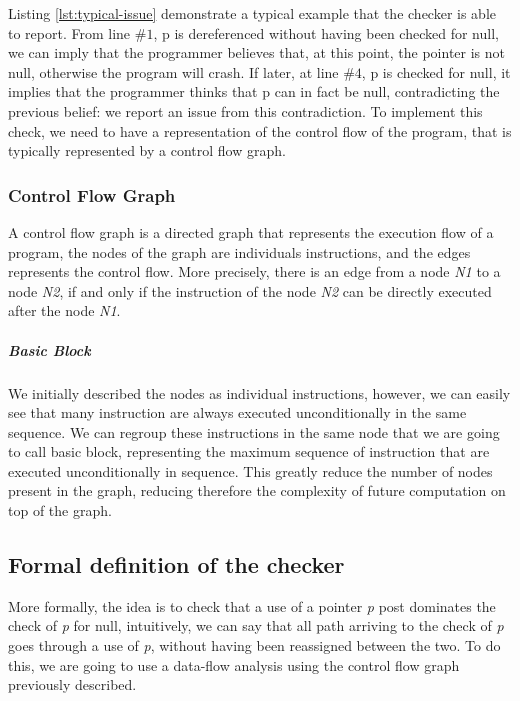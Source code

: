 

Listing \ref{lst:typical-issue} demonstrate a typical example that the checker is able to report. 
From line $\#1$, p is dereferenced without having been checked for null, we can imply that the programmer believes that, at this point, the pointer is not null, otherwise the program will crash. 
If later, at line $\#4$, p is checked for null, it implies that the programmer thinks that p can in fact be null, contradicting the previous belief: we report an issue from this contradiction.
To implement this check, we need to have a representation of the control flow of the program, that is typically represented by a control flow graph.

\subsubsection{Control Flow Graph}
\label{subsubsec:control_flow_graph}

A control flow graph is a directed graph that represents the execution flow of a program, the nodes of the graph are individuals instructions, and the edges represents the control flow. More precisely, there is an edge from a node \emph{N1} to a node \emph{N2}, if and only if the instruction of the node \emph{N2} can be directly executed after the node \emph{N1}.


\subparagraph{Basic Block}
We initially described the nodes as individual instructions, however, we can easily see that many instruction are always executed unconditionally in the same sequence.
We can regroup these instructions in the same node that we are going to call basic block, representing the maximum sequence of instruction that are executed unconditionally in sequence. 
This greatly reduce the number of nodes present in the graph, reducing therefore the complexity of future computation on top of the graph.

\subsection{Formal definition of the checker}
\label{subsec:checker_formal_definition}
More formally, the idea is to check that a use of a pointer \emph{p} post dominates the check of \emph{p} for null, intuitively, we can say that all path arriving to the check of \emph{p} goes through a use of \emph{p}, without having been reassigned between the two. 
To do this, we are going to use a data-flow analysis using the control flow graph previously described.

